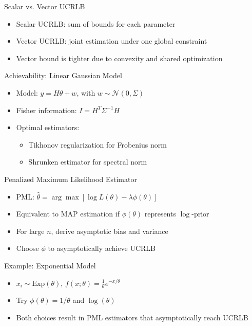 \documentclass{beamer}
\begin{document}
\begin{frame}{Scalar vs. Vector UCRLB}
  \begin{itemize}
    \item Scalar UCRLB: sum of bounds for each parameter
    \item Vector UCRLB: joint estimation under one global constraint
    \item Vector bound is tighter due to convexity and shared optimization
  \end{itemize}
\end{frame}

\begin{frame}{Achievability: Linear Gaussian Model}
  \begin{itemize}
    \item Model: $y = H \theta + w$, with $w \sim \mathcal{N}(0, \Sigma)$
    \item Fisher information: $I = H^T \Sigma^{-1} H$
    \item Optimal estimators:
    \begin{itemize}
      \item Tikhonov regularization for Frobenius norm
      \item Shrunken estimator for spectral norm
    \end{itemize}
  \end{itemize}
\end{frame}

\begin{frame}{Penalized Maximum Likelihood Estimator}
  \begin{itemize}
    \item PML: $\hat{\theta} = \arg\max \left[ \log L(\theta) - \lambda \phi(\theta) \right]$
    \item Equivalent to MAP estimation if $\phi(\theta)$ represents $\log$-prior
    \item For large $n$, derive asymptotic bias and variance
    \item Choose $\phi$ to asymptotically achieve UCRLB
  \end{itemize}
\end{frame}

\begin{frame}{Example: Exponential Model}
  \begin{itemize}
    \item $x_i \sim \text{Exp}(\theta)$, $f(x;\theta) = \frac{1}{\theta} e^{-x/\theta}$
    \item Try $\phi(\theta) = 1/\theta$ and $\log(\theta)$
    \item Both choices result in PML estimators that asymptotically reach UCRLB
  \end{itemize}
\end{frame}
\end{document}
